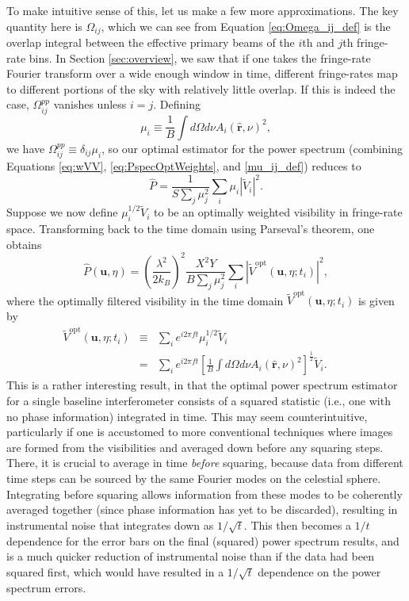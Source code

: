 \documentclass[twocolumn,apj,numberedappendix]{emulateapj}
\newcommand{\rhat}{\hat{\mathbf{r}}}
\begin{document}
To make intuitive sense of this, let us make a few more approximations. The key quantity here is $\Omega_{ij}$, which we can see from Equation \eqref{eq:Omega_ij_def} is the overlap integral between the effective primary beams of the $i$th and $j$th fringe-rate bins. In Section \ref{sec:overview}, we saw that if one takes the fringe-rate Fourier transform over a wide enough window in time, different fringe-rates map to different portions of the sky with relatively little overlap. If this is indeed the case, $\Omega_{ij}^{pp}$ vanishes unless $i=j$. Defining
\begin{equation}
\label{mu_ij_def}
\mu_i  \equiv \frac{1}{B} \int d\Omega d\nu A_i(\rhat,\nu)^2,
\end{equation}
we have $\Omega_{ij}^{pp} \equiv \delta_{ij} \mu_i$, so our optimal estimator for the power spectrum (combining Equations \ref{eq:wVV}, \ref{eq:PspecOptWeights}, and \ref{mu_ij_def}) reduces to
\begin{equation}
\widehat{P} = \frac{1}{S \sum_j \mu_j^2}\sum_i \mu_i | \widetilde{V}_i |^2 .
\end{equation}
Suppose we now define $\mu_i^{1/2} \widetilde{V}_i$ to be an optimally weighted visibility in fringe-rate space. Transforming back to the time domain using Parseval's theorem, one obtains
\begin{equation}
\label{eq:finalEst}
\widehat{P}(\mathbf{u}, \eta) = \left( \frac{\lambda^2}{2 k_B} \right)^2 \frac{X^2 Y}{B\sum_j \mu_j^2} \sum_i |\widetilde{V}^\textrm{opt} (\mathbf{u}, \eta; t_i)|^2,
\end{equation}
where the optimally filtered visibility in the time domain $\widetilde{V}^\textrm{opt} (\mathbf{u}, \eta; t_i)$ is given by
\begin{eqnarray}
\widetilde{V}^\textrm{opt} (\mathbf{u}, \eta; t_i) &\equiv& \sum_i e^{i 2 \pi f t} \mu_i^{1/2} \widetilde{V}_i \nonumber \\
&=&  \sum_i e^{i 2 \pi f t} \left[\frac{1}{B} \int d\Omega d\nu A_i(\rhat,\nu)^2\right]^\frac{1}{2} \widetilde{V}_i. \qquad
\end{eqnarray}
This is a rather interesting result, in that the optimal power spectrum estimator for a single baseline interferometer consists of a squared statistic (i.e., one with no phase information) integrated in time. This may seem counterintuitive, particularly if one is accustomed to more conventional techniques where images are formed from the visibilities and averaged down before any squaring steps. There, it is crucial to average in time \emph{before} squaring, because data from different time steps can be sourced by the same Fourier modes on the celestial sphere. Integrating before squaring allows information from these modes to be coherently averaged together (since phase information has yet to be discarded), resulting in instrumental noise that integrates down as $1/\sqrt{t}$. This then becomes a $1/t$ dependence for the error bars on the final (squared) power spectrum results, and is a much quicker reduction of instrumental noise than if the data had been squared first, which would have resulted in a $1/\sqrt{t}$ dependence on the power spectrum errors.
\end{document}
